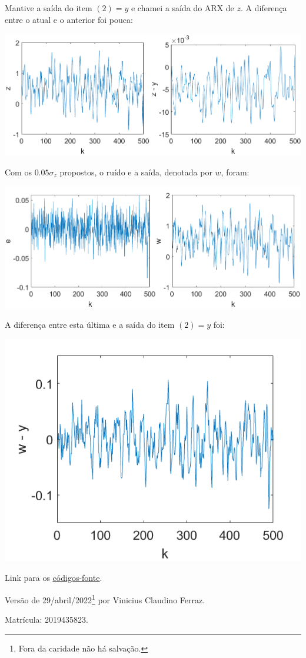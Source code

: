 \documentclass{rbfin}
\begin{document}
Mantive a saída do item $(2) = y$ e chamei a saída do ARX de $z$. A diferença entre o atual e o anterior foi pouca:

\begin{center}
\includegraphics[scale=0.65]{q3z}
\end{center}

Com os $0.05 \sigma_z$ propostos, o ruído e a saída, denotada por $w$, foram:

\begin{center}
\includegraphics[scale=0.65]{q3ew}
\end{center}

A diferença entre esta última e a saída do item $(2) = y$ foi:

\begin{center}
\includegraphics[scale=0.666]{q3wy}
\end{center}

\vspace{6mm}

Link para os \href{https://drive.google.com/file/d/1dgYeXCoKoHh6rJu9oeesB-6cMUV_UR9D/view?usp=sharing}{\color{blue}\underline{códigos-fonte}}.

Versão de 29/abril/2022\footnote{Fora da caridade não há salvação.} por Vinicius Claudino Ferraz. 

Matrícula: 2019435823.
\end{document}
